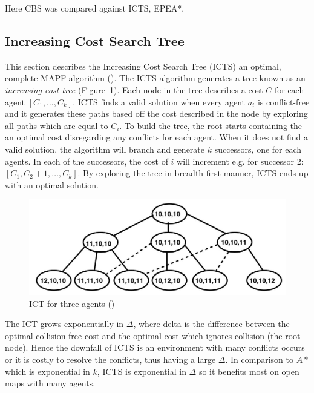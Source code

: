 \documentclass[a4paper,11pt]{article}
\begin{document}
Here CBS was compared against ICTS, EPEA*.

\subsection{Increasing Cost Search Tree}
This section describes the Increasing Cost Search Tree (ICTS) an optimal, complete MAPF algorithm (\cite{sharon2011increasing}). The ICTS algorithm generates a tree known as an \textit{increasing cost tree} (Figure~\ref{fig:increasingcosttree}). Each node in the tree describes a cost $C$ for each agent $[C_1,\dots,C_k]$. ICTS finds a valid solution when every agent $a_i$ is conflict-free and it generates these paths based off the cost described in the node by exploring all paths which are equal to $C_i$.  To build the tree, the root starts containing the an optimal cost disregarding any conflicts for each agent. When it does not find a valid solution, the algorithm will branch and generate $k$ successors, one for each agents. In each of the successors, the cost of $i$ will increment e.g. for successor 2: $[C_1,C_{2}+1,\dots,C_k]$. By exploring the tree in breadth-first manner, ICTS ends up with an optimal solution.

\begin{figure}[!htb]
	\centering
	\centering
	\includegraphics[width=0.9\linewidth]{graphics/ictstree}
	\caption{ICT for three agents (\cite{sharon2011increasing})}
	\label{fig:increasingcosttree}
\end{figure}

The ICT grows exponentially in $\Delta$, where delta is the difference between the optimal collision-free cost and the optimal cost which ignores collision (the root node). Hence the downfall of ICTS is an environment with many conflicts occurs or it is costly to resolve the conflicts, thus having a large $\Delta$. In comparison to $A*$ which is exponential in $k$, ICTS is exponential in $\Delta$ so it benefits most on open maps with many agents.
\end{document}
